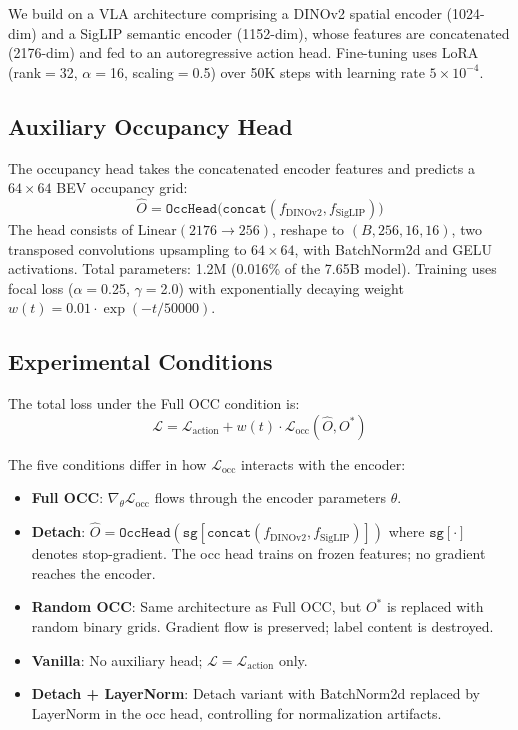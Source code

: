\documentclass[letterpaper]{article}
\begin{document}
We build on a VLA architecture comprising a DINOv2 spatial encoder (1024-dim) and a SigLIP semantic encoder (1152-dim), whose features are concatenated (2176-dim) and fed to an autoregressive action head. Fine-tuning uses LoRA (rank$=$32, $\alpha$$=$16, scaling$=$0.5) over 50K steps with learning rate $5 \times 10^{-4}$.

\subsection{Auxiliary Occupancy Head}

The occupancy head takes the concatenated encoder features and predicts a $64 \times 64$ BEV occupancy grid:
\begin{equation}
    \hat{O} = \texttt{OccHead}\bigl(\texttt{concat}(f_{\text{DINOv2}}, f_{\text{SigLIP}})\bigr)
\end{equation}
The head consists of Linear$(2176 \to 256)$, reshape to $(B, 256, 16, 16)$, two transposed convolutions upsampling to $64 \times 64$, with BatchNorm2d and GELU activations. Total parameters: 1.2M (0.016\% of the 7.65B model). Training uses focal loss ($\alpha$$=$0.25, $\gamma$$=$2.0) with exponentially decaying weight $w(t) = 0.01 \cdot \exp(-t/50000)$.

\subsection{Experimental Conditions}

The total loss under the Full OCC condition is:
\begin{equation}
    \mathcal{L} = \mathcal{L}_{\text{action}} + w(t) \cdot \mathcal{L}_{\text{occ}}(\hat{O}, O^*)
\end{equation}

The five conditions differ in how $\mathcal{L}_{\text{occ}}$ interacts with the encoder:

\begin{itemize}
    \item \textbf{Full OCC}: $\nabla_\theta \mathcal{L}_{\text{occ}}$ flows through the encoder parameters $\theta$.
    \item \textbf{Detach}: $\hat{O} = \texttt{OccHead}(\texttt{sg}[\texttt{concat}(f_{\text{DINOv2}}, f_{\text{SigLIP}})])$ where $\texttt{sg}[\cdot]$ denotes stop-gradient. The occ head trains on frozen features; no gradient reaches the encoder.
    \item \textbf{Random OCC}: Same architecture as Full OCC, but $O^*$ is replaced with random binary grids. Gradient flow is preserved; label content is destroyed.
    \item \textbf{Vanilla}: No auxiliary head; $\mathcal{L} = \mathcal{L}_{\text{action}}$ only.
    \item \textbf{Detach + LayerNorm}: Detach variant with BatchNorm2d replaced by LayerNorm in the occ head, controlling for normalization artifacts.
\end{itemize}
\end{document}
